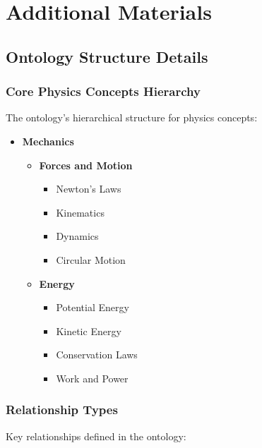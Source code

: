 \chapter{Additional Materials}
\label{app:additional}

\section{Ontology Structure Details}
\label{sec:ontology-structure}

\subsection{Core Physics Concepts Hierarchy}
The ontology's hierarchical structure for physics concepts:

\begin{itemize}
    \item \textbf{Mechanics}
        \begin{itemize}
            \item \textbf{Forces and Motion}
                \begin{itemize}
                    \item Newton's Laws
                    \item Kinematics
                    \item Dynamics
                    \item Circular Motion
                \end{itemize}
            \item \textbf{Energy}
                \begin{itemize}
                    \item Potential Energy
                    \item Kinetic Energy
                    \item Conservation Laws
                    \item Work and Power
                \end{itemize}
        \end{itemize}
\end{itemize}

\subsection{Relationship Types}
Key relationships defined in the ontology:

